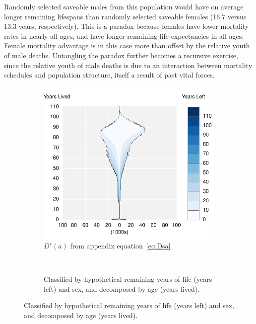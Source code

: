 \documentclass{article}
\begin{document}
Randomly
selected saveable males from this population would have on average longer
remaining lifespans than randomly selected saveable females (16.7 versus 13.3 years,
respectively). This is a paradox because females have lower mortality rates in
nearly all ages, and have longer remaining life expectancies in all ages. Female
mortality advantage is in this case more than offset by the relative youth of
male deaths. Untangling the paradox further becomes a recursive exercise,
since the relative youth of male deaths is due to an interaction between
mortality schedules and population structure, itself a result of past
vital forces.

\begin{figure}
\centering
\caption{Potentially saveable lives (deaths) in the US by sex, 2010}
\label{fig:1}
\begin{subfigure}[b]{.48\linewidth}
\centering
	\caption{Classified by age (years lived) and sex, and decomposed
by hypothetical remaining years of life (years left).}
	\label{fig:Day}
	\includegraphics[scale=.55]{Figures/Deathsxy10.pdf}	
	\caption*{$D^s(a)$ from appendix equation~\eqref{eq:Dsa}}
\end{subfigure}
~
\begin{subfigure}[b]{.48\linewidth}
\centering
    \caption{Classified by hypothetical remaining years of life
(years left) and sex, and decomposed by age (years lived).}
	\label{fig:Dya}

\end{subfigure}
\end{figure}
\end{document}
